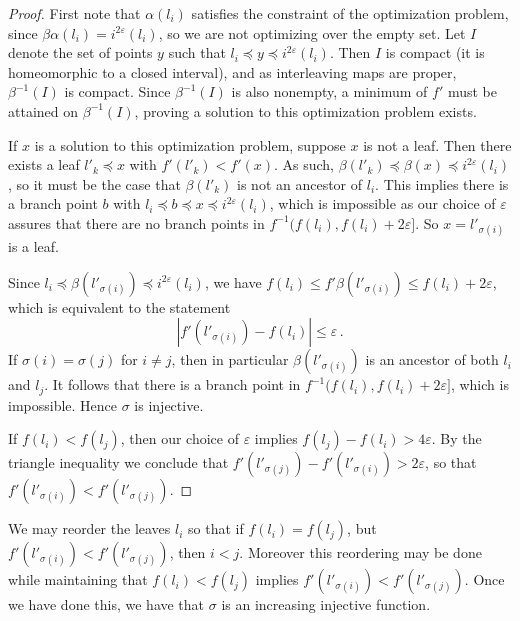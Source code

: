 \documentclass{article}
\theoremstyle{definition}
\renewcommand{\epsilon}{\varepsilon}
\begin{document}
\begin{proof}
    First note that $\alpha(l_i)$ satisfies the constraint of the optimization problem, since $\beta \alpha (l_i) = i^{2\epsilon}(l_i)$, so we are not optimizing over the empty set. Let $I$ denote the set of points $y$ such that $l_i \preceq y \preceq i^{2\epsilon}(l_i)$. Then $I$ is compact (it is homeomorphic to a closed interval), and as interleaving maps are proper, $\beta^{-1}(I)$ is compact. Since $\beta^{-1}(I)$ is also nonempty, a minimum of $f'$ must be attained on $\beta^{-1}(I)$, proving a solution to this optimization problem exists.

    If $x$ is a solution to this optimization problem, suppose $x$ is not a leaf. Then there exists a leaf $l'_k \preceq x$ with $f'(l'_k) < f'(x)$. As such, $\beta(l'_k) \preceq \beta(x) \preceq i^{2\epsilon}(l_i)$, so it must be the case that $\beta(l'_k)$ is not an ancestor of $l_i$. This implies there is a branch point $b$ with $l_i \preceq b \preceq x \preceq i^{2\epsilon}(l_i)$, which is impossible as our choice of $\epsilon$ assures that there are no branch points in $f^{-1}(f(l_i),f(l_i) + 2\epsilon]$. So $x = l'_{\sigma(i)}$ is a leaf.

    Since $l_i \preceq \beta(l'_{\sigma(i)}) \preceq i^{2\epsilon}(l_i)$, we have $f(l_i) \leq f'\beta(l'_{\sigma(i)}) \leq f(l_i) + 2\epsilon$, which is equivalent to the statement
    \begin{equation*}
        |f'(l'_{\sigma(i)}) -f(l_i)| \leq \epsilon\,.
    \end{equation*}
    If $\sigma(i) = \sigma(j)$ for $i \neq j$, then in particular $\beta(l'_{\sigma(i)})$ is an ancestor of both $l_i$ and $l_j$. It follows that there is a branch point in $f^{-1}(f(l_i),f(l_i) + 2\epsilon]$, which is impossible. Hence $\sigma$ is injective.

    If $f(l_i) < f(l_j)$, then our choice of $\epsilon$ implies $f(l_j) - f(l_i) > 4\epsilon$. By the triangle inequality we conclude that $f'(l'_{\sigma(j)})-f'(l'_{\sigma(i)}) > 2\epsilon$, so that $f'(l'_{\sigma(i)}) < f'(l'_{\sigma(j)})$.
\end{proof}

We may reorder the leaves $l_i$ so that if $f(l_i) = f(l_j)$, but $f'(l'_{\sigma(i)}) < f'(l'_{\sigma(j)})$, then $i < j$. Moreover this reordering may be done while maintaining that $f(l_i) < f(l_j)$ implies $f'(l'_{\sigma(i)}) < f'(l'_{\sigma(j)})$. Once we have done this, we have that $\sigma$ is an increasing injective function.
\end{document}
